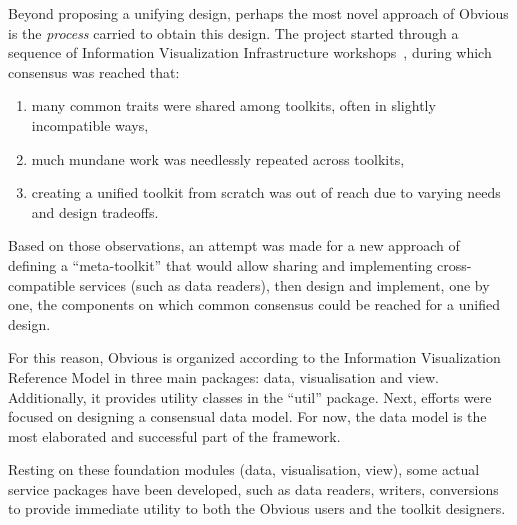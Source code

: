 Beyond proposing a unifying design, perhaps the most novel approach of
Obvious is the \emph{process} carried to obtain this design.  The
project started through a sequence of Information Visualization
Infrastructure workshops~\cite{visinfrastructure1, visinfrastructure2,
vismaster2008}, during which consensus was reached that:

\begin{enumerate}[noitemsep]
\item many common traits were shared among toolkits, often in slightly
  incompatible ways,
\item much mundane work was needlessly repeated across toolkits,
\item creating a unified toolkit from scratch was out of reach due to
  varying needs and design tradeoffs.
\end{enumerate}

Based on those observations, an attempt was made for a new approach of
defining a ``meta-toolkit'' that would allow sharing and implementing
cross-compatible services (such as data readers), then design and
implement, one by one, the components on which common consensus could
be reached for a unified design.

For this reason, Obvious is organized according to the Information
Visualization Reference Model in three main packages: data,
visualisation and view. Additionally, it provides utility classes in
the ``util'' package.  Next, efforts were focused on designing a
consensual data model. For now, the data model is the most elaborated
and successful part of the framework.  

Resting on these foundation modules (data, visualisation, view), some
actual service packages have been developed, such as data readers,
writers, conversions to provide immediate utility to both the Obvious
users and the toolkit designers.

